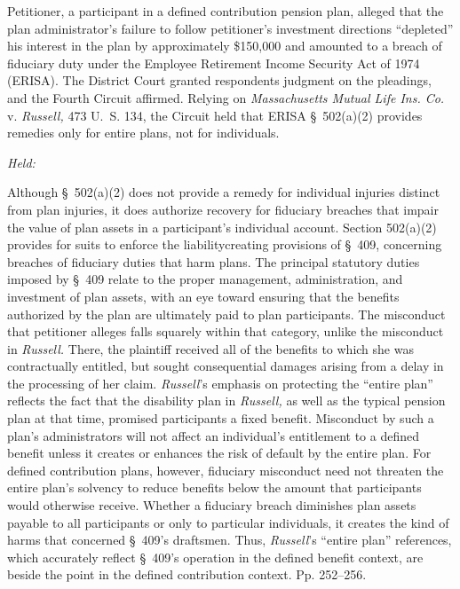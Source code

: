 
\setcounter{page}{248}

  Petitioner, a participant in a defined contribution pension plan, alleged that the plan administrator's failure to follow petitioner's investment directions ``depleted'' his interest in the plan by approximately \$150,000 and amounted to a breach of fiduciary duty under the Employee Retirement Income Security Act of 1974 (ERISA). The District Court granted respondents judgment on the pleadings, and the Fourth Circuit affirmed. Relying on \emph{Massachusetts Mutual Life Ins. Co.} v. \emph{Russell,} 473 U.~S. 134, the Circuit held that ERISA \S~502(a)(2) provides remedies only for entire plans, not for individuals.

\emph{Held:}

  Although \S~502(a)(2) does not provide a remedy for individual injuries distinct from plan injuries, it does authorize recovery for fiduciary breaches that impair the value of plan assets in a participant's individual account. Section 502(a)(2) provides for suits to enforce the liabilitycreating provisions of \S~409, concerning breaches of fiduciary duties that harm plans. The principal statutory duties imposed by \S~409 relate to the proper management, administration, and investment of plan assets, with an eye toward ensuring that the benefits authorized by the plan are ultimately paid to plan participants. The misconduct that petitioner alleges falls squarely within that category, unlike the misconduct in \emph{Russell.} There, the plaintiff received all of the benefits to which she was contractually entitled, but sought consequential damages arising from a delay in the processing of her claim. \emph{Russell}'s emphasis on protecting the ``entire plan'' reflects the fact that the disability plan in \emph{Russell,} as well as the typical pension plan at that time, promised participants a fixed benefit. Misconduct by such a plan's administrators will not affect an individual's entitlement to a defined benefit unless it creates or enhances the risk of default by the entire plan. For defined contribution plans, however, fiduciary misconduct need not threaten the entire plan's solvency to reduce benefits below the amount that participants would otherwise receive. Whether a fiduciary breach diminishes plan assets payable to all participants or only to particular individuals, it creates the kind of harms that concerned \S~409's draftsmen. Thus, \newpage \emph{Russell}'s ``entire plan'' references, which accurately reflect \S~409's operation in the defined benefit context, are beside the point in the defined contribution context. Pp. 252--256.

